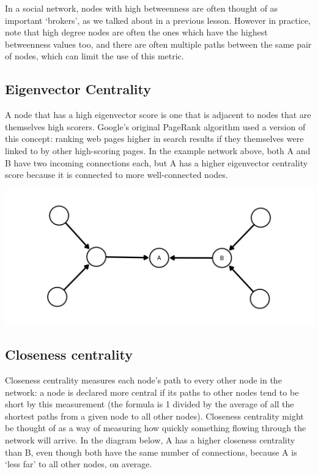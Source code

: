 \documentclass[
]{book}
\begin{document}
In a social network, nodes with high betweenness are often thought of as important `brokers', as we talked about in a previous lesson. However in practice, note that high degree nodes are often the ones which have the highest betweenness values too, and there are often multiple paths between the same pair of nodes, which can limit the use of this metric.

\hypertarget{eigenvector-centrality}{%
\subsection{Eigenvector Centrality}\label{eigenvector-centrality}}

A node that has a high eigenvector score is one that is adjacent to nodes that are themselves high scorers. Google's original PageRank algorithm used a version of this concept: ranking web pages higher in search results if they themselves were linked to by other high-scoring pages. In the example network above, both A and B have two incoming connections each, but A has a higher eigenvector centrality score because it is connected to more well-connected nodes.

\includegraphics{images/eigenvector.png}

\hypertarget{closeness-centrality}{%
\subsection{Closeness centrality}\label{closeness-centrality}}

Closeness centrality measures each node's path to every other node in the network: a node is declared more central if its paths to other nodes tend to be short by this measurement (the formula is 1 divided by the average of all the shortest paths from a given node to all other nodes). Closeness centrality might be thought of as a way of measuring how quickly something flowing through the network will arrive. In the diagram below, A has a higher closeness centrality than B, even though both have the same number of connections, because A is `less far' to all other nodes, on average.
\end{document}
